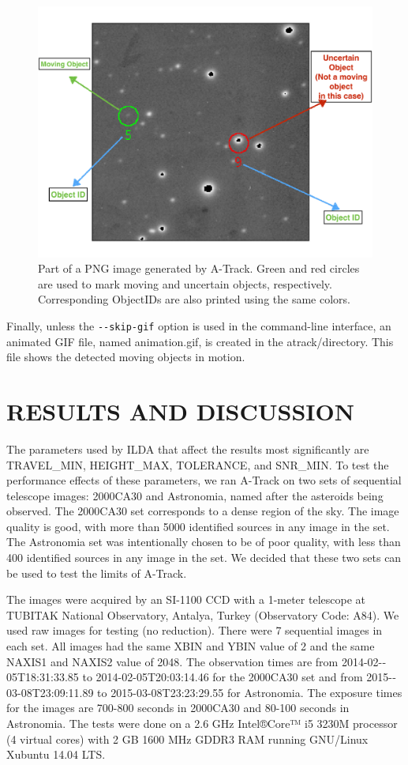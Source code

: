 \documentclass[review]{elsarticle}
\begin{document}
\begin{figure}[!h]
  \centering
  \includegraphics[width=1.0\textwidth]{figure_6_real_image}
  \caption{Part of a PNG image generated by A-Track. Green and red circles are used to mark moving and uncertain objects, respectively. Corresponding ObjectIDs are also printed using the same colors.}
  \label{fig:realimage}
\end{figure}

Finally, unless the \verb;--skip-gif; option is used in the command-line interface, an animated GIF file, named animation.gif, is created in the atrack/directory. This file shows the detected moving objects in motion.


\section{RESULTS AND DISCUSSION}

The parameters used by ILDA that affect the results most significantly are TRAVEL\_MIN, HEIGHT\_MAX, TOLERANCE, and SNR\_MIN. To test the performance effects of these parameters, we ran A-Track on two sets of sequential telescope images: 2000CA30 and Astronomia, named after the asteroids being observed. The 2000CA30 set corresponds to a dense region of the sky. The image quality is good, with more than 5000 identified sources in any image in the set. The Astronomia set was intentionally chosen to be of poor quality, with less than 400 identified sources in any image in the set. We decided that these two sets can be used to test the limits of A-Track.

The images were acquired by an SI-1100 CCD with a 1-meter telescope at TUBITAK National Observatory, Antalya, Turkey (Observatory Code: A84). We used raw images for testing (no reduction). There were 7 sequential images in each set. All images had the same XBIN and YBIN value of 2 and the same NAXIS1 and NAXIS2 value of 2048. The observation times are from 2014-­02-­05T18:31:33.85 to 2014-­02-­05T20:03:14.46 for the 2000CA30 set and from 2015-­03-­08T23:09:11.89 to 2015-­03-­08T23:23:29.55 for Astronomia. The exposure times for the images are 700-800 seconds in 2000CA30 and 80-100 seconds in Astronomia. The tests were done on a 2.6 GHz Intel®Core™ i5 3230M processor (4 virtual cores) with 2 GB 1600 MHz GDDR3 RAM running GNU/Linux Xubuntu 14.04 LTS.
\end{document}
